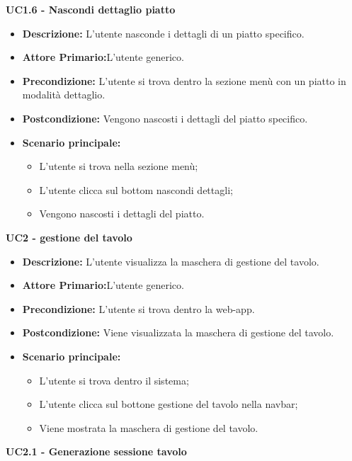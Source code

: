 \textbf{UC1.6 - Nascondi dettaglio piatto}
\begin{itemize}
    \item \textbf{Descrizione:} L'utente nasconde i dettagli di un piatto specifico.
    \item \textbf{Attore Primario:}L'utente generico.
    \item \textbf{Precondizione:} L'utente si trova dentro la sezione menù con un piatto in modalità dettaglio.
    \item \textbf{Postcondizione:} Vengono nascosti i dettagli del piatto specifico.
    \item \textbf{Scenario principale:}  
    \begin{itemize}
        \item L'utente si trova nella sezione menù;
        \item L'utente clicca sul bottom nascondi dettagli;
        \item Vengono nascosti i dettagli del piatto.
    \end{itemize}
\end{itemize}
\textbf{UC2 - gestione del tavolo}
\begin{itemize}
    \item \textbf{Descrizione:} L'utente visualizza la maschera di gestione del tavolo.
    \item \textbf{Attore Primario:}L'utente generico.
    \item \textbf{Precondizione:} L'utente si trova dentro la web-app.
    \item \textbf{Postcondizione:} Viene visualizzata la maschera di gestione del tavolo.
    \item \textbf{Scenario principale:}
    \begin{itemize}
        \item L'utente si trova dentro il sistema;
        \item L'utente clicca sul bottone gestione del tavolo nella navbar;
        \item Viene mostrata la maschera di gestione del tavolo.
    \end{itemize}
\end{itemize}
\textbf{UC2.1 - Generazione sessione tavolo}
